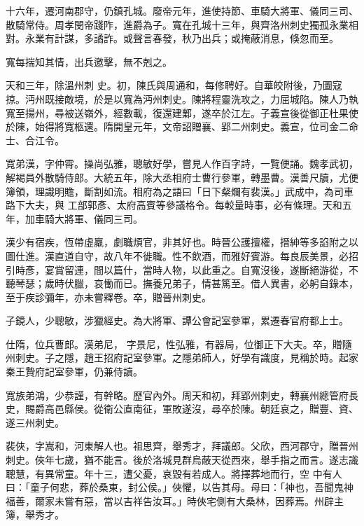 \begin{pinyinscope}
 十六年，遷河南郡守，仍鎮孔城。廢帝元年，進使持節、車騎大將軍、儀同三司、散騎常侍。周孝閔帝踐阼，進爵為子。寬在孔城十三年，與齊洛州刺史獨孤永業相對。永業有計謀，多譎詐。或聲言春發，秋乃出兵；或掩蔽消息，倏忽而至。



 寬每揣知其情，出兵邀擊，無不剋之。



 天和三年，除溫州刺
 史。初，陳氏與周通和，每修聘好。自華皎附後，乃圖寇掠。沔州既接敵境，於是以寬為沔州刺史。陳將程靈洗攻之，力屈城陷。陳人乃執寬至揚州，尋被送嶺外，經數載，復還建鄴，遂卒於江左。子義宣後從御正杜果使於陳，始得將寬柩還。隋開皇元年，文帝詔贈襄、郢二州刺史。義宣，位司金二命士、合江令。



 寬弟漢，字仲霄。操尚弘雅，聰敏好學，嘗見人作百字詩，一覽便誦。魏孝武初，解褐員外散騎侍郎。大統五年，除大丞相府士曹行參軍，轉墨曹。漢善尺牘，尤便簿領，理識明贍，斷割如流。相府為之語曰「日下粲爛有裴漢。」武成中，為司車路下大夫，與
 工部郭彥、太府高賓等參議格令。每較量時事，必有條理。天和五年，加車騎大將軍、儀同三司。



 漢少有宿疾，恆帶虛羸，劇職煩官，非其好也。時晉公護擅權，搢紳等多諂附之以圖仕進。漢直道自守，故八年不徙職。性不飲酒，而雅好賓游。每良辰美景，必招引時彥，宴賞留連，間以篇什，當時人物，以此重之。自寬沒後，遂斷絕游從，不聽琴瑟；歲時伏臘，哀慟而已。撫養兄弟子，情甚篤至。借人異書，必躬自錄本，至于疾診彌年，亦未嘗釋卷。卒，贈晉州刺史。



 子鏡人，少聰敏，涉獵經史。為大將軍、譚公會記室參軍，累遷春官府都上士。



 仕隋，位兵曹郎。漢弟尼，
 字景尼，性弘雅，有器局，位御正下大夫。卒，贈隨州刺史。子之隱，趙王招府記室參軍。之隱弟師人，好學有識度，見稱於時。起家秦王贄府記室參軍，仍兼侍讀。



 寬族弟鴻，少恭謹，有幹略。歷官內外。周天和初，拜郢州刺史，轉襄州總管府長史，賜爵高邑縣侯。從衛公直南征，軍敗遂沒，尋卒於陳。朝廷哀之，贈豐、資、遂三州刺史。



 裴俠，字嵩和，河東解人也。祖思齊，舉秀才，拜議郎。父欣，西河郡守，贈晉州刺史。俠年七歲，猶不能言。後於洛城見群烏蔽天從西來，舉手指之而言。遂志識聰慧，有異常童。年十三，遭父憂，哀毀有若成人。將擇葬地而行，空
 中有人曰：「童子何悲，葬於桑東，封公侯。」俠懼，以告其母。母曰：「神也，吾聞鬼神福善，爾家未嘗有惡，當以吉祥告汝耳。」時俠宅側有大桑林，因葬焉。州辟主簿，舉秀才。




\end{pinyinscope}
